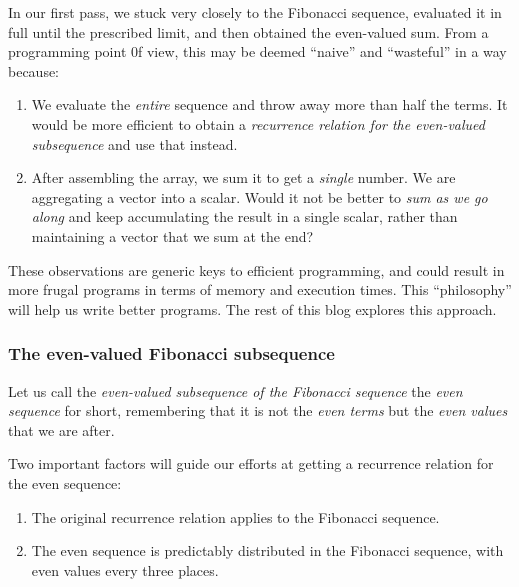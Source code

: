 \documentclass[
  a4paper,
]{article}
\begin{document}
In our first pass, we stuck very closely to the Fibonacci sequence,
evaluated it in full until the prescribed limit, and then obtained the
even-valued sum. From a programming point 0f view, this may be deemed
``naive'' and ``wasteful'' in a way because:

\begin{enumerate}
\item
  We evaluate the \emph{entire} sequence and throw away more than half
  the terms. It would be more efficient to obtain a \emph{recurrence
  relation for the even-valued subsequence} and use that instead.
\item
  After assembling the array, we sum it to get a \emph{single} number.
  We are aggregating a vector into a scalar. Would it not be better to
  \emph{sum as we go along} and keep accumulating the result in a single
  scalar, rather than maintaining a vector that we sum at the end?
\end{enumerate}

These observations are generic keys to efficient programming, and could
result in more frugal programs in terms of memory and execution times.
This ``philosophy'' will help us write better programs. The rest of this
blog explores this approach.

\hypertarget{the-even-valued-fibonacci-subsequence-1}{%
\subsubsection{The even-valued Fibonacci
subsequence}\label{the-even-valued-fibonacci-subsequence-1}}

Let us call the \emph{even-valued subsequence of the Fibonacci sequence}
the \emph{even sequence} for short, remembering that it is not the
\emph{even terms} but the \emph{even values} that we are after.

Two important factors will guide our efforts at getting a recurrence
relation for the even sequence:

\begin{enumerate}
\item
  The original recurrence relation applies to the Fibonacci sequence.
\item
  The even sequence is predictably distributed in the Fibonacci
  sequence, with even values every three places.
\end{enumerate}
\end{document}
